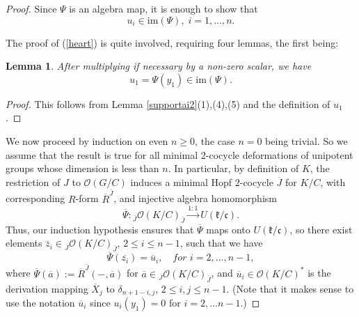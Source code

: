 \documentclass{amsart}
\numberwithin{equation}{section}
\newtheorem{lemma}[theorem]{Lemma}
\theoremstyle{definition}
\begin{document}
\begin{proof}
Since $\Psi$ is an algebra map, it is enough to show that 
\begin{equation}\label{heart} u_i \in \mathrm{im}(\Psi),\; i = 1, \ldots , n.
\end{equation}

The proof of (\ref{heart}) is quite involved, requiring four lemmas, the first being:

\begin{lemma}\label{Claim I} 
After multiplying if necessary by a non-zero scalar, we have 
\begin{equation}\label{start} u_1=\Psi(y_1)\in \mathrm{im}(\Psi).
\end{equation}
\end{lemma} 

\begin{proof}
This follows from Lemma \ref{supportai2}(1),(4),(5) and the definition of $u_1$.
\end{proof}
 
We now proceed by induction on even $n\ge 0$, the case $n=0$ being trivial. So we assume that the result is true for all minimal $2$-cocycle deformations of unipotent groups whose dimension is less than $n$. In particular, by definition of $K$, the restriction of $J$ to $\mathcal{O}(G/C)$ induces a minimal Hopf $2$-cocycle $\overline{J}$ for $K/C$, with corresponding $R$-form $\overline{R}^{\overline{J}}$, and injective algebra homomorphism 
$$\overline{\Psi} : {}_{\overline{J}}\mathcal{O}(K/C)_{\overline{J}} \xrightarrow{1:1} U(\mathfrak{k}/\mathfrak{c}).$$
Thus, our induction hypothesis ensures that $\overline{\Psi}$ maps onto $U(\mathfrak{k}/\mathfrak{c})$, so there exist elements $\overline{z}_i\in {}_{\overline{J}}\mathcal{O}(K/C)_{\overline{J}}$, $2 \leq i \leq n-1$, such that we have
\begin{equation}\label{induct}  \overline{\Psi} (\overline{z_i})= \overline{u}_{i}, \quad \textit{for } i = 2, \ldots , n-1,
\end{equation}
where $\overline{\Psi}(\overline{a}) := \overline{R}^{\overline{J}}(-,\overline{a}) $ for $\overline{a} \in {}_{\overline{J}}\mathcal{O}(K/C)_{\overline{J}}$, and $\overline{u}_{i} \in \mathcal{O}(K/C)^*$ is the derivation mapping $\overline{X}_j$ to $\delta_{n+1 - i,j}$, $2 \leq i,j \leq n-1$. (Note that it makes sense to use the notation $\overline{u}_{i}$ since $u_{i} (y_1) = 0$ for $i = 2, \ldots n-1$.)


\end{proof}
\end{document}
